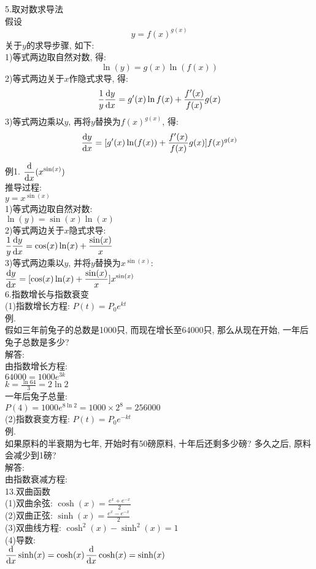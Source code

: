 5.取对数求导法\\
假设
\[y=f(x)^{g(x)}\]
关于$y$的求导步骤, 如下:\\
1)等式两边取自然对数, 得:
\[\ln(y)=g(x)\ln(f(x))\]
2)等式两边关于$x$作隐式求导, 得:
\[\frac{1}{y}\frac{\mathop{}\!\mathrm{d} y}{\mathop{}\!\mathrm{d} x}=g'(x)\ln f(x)+\frac{f'(x)}{f(x)}g(x)\]
3)等式两边乘以$y$, 再将$y$替换为$f(x)^{g(x)}$, 得:
\[\frac{\mathop{}\!\mathrm{d} y}{\mathop{}\!\mathrm{d} x}=[g'(x)\ln(f(x))+\frac{f'(x)}{f(x)}g(x)]f(x)^{g(x)}\]

例1.
\phantom{例}$\displaystyle\frac{\mathop{}\!\mathrm{d}}{\mathop{}\!\mathrm{d} x}(x^{\sin(x)})$\\
推导过程:\\
$\displaystyle y=x^{\sin(x)}$\\
1)等式两边取自然对数:\\
\phantom{\qquad}$\displaystyle\ln(y)=\sin(x)\ln(x)$\\
2)等式两边关于$x$隐式求导:\\
\phantom{\qquad}$\displaystyle\frac{1}{y}\frac{\mathop{}\!\mathrm{d} y}{\mathop{}\!\mathrm{d} x}=\cos(x)\ln(x)+\frac{\sin(x)}{x}$\\
3)等式两边乘以$y$, 并将$y$替换为$x^{\sin(x)}$:\\
\phantom{\qquad}$\displaystyle\frac{\mathop{}\!\mathrm{d} y}{\mathop{}\!\mathrm{d} x}=[\cos(x)\ln(x)+\frac{\sin(x)}{x}]x^{\sin(x)}$\\[2ex]

6.指数增长与指数衰变\\
(1)指数增长方程: $\displaystyle P(t)=P_0e^{kt}$\\
例.\\
\phantom{空格}假如三年前兔子的总数是1000只, 而现在增长至64000只, 那么从现在开始, 一年后兔子总数是多少?\\
解答:\\
由指数增长方程:\\
\phantom{qquad}$\displaystyle 64000=1000e^{3k}$\\
$\displaystyle k=\frac{\ln64}{3}=2\ln2$\\
一年后兔子总量:\\
$\displaystyle P(4)=1000e^{8\ln2}=1000\times2^8=256000$\\[1ex]

(2)指数衰变方程: $P(t)=P_0e^{-kt}$\\
例.\\
\phantom{空格}如果原料的半衰期为七年, 开始时有50磅原料, 十年后还剩多少磅? 多久之后, 原料会减少到1磅?\\
解答:\\
由指数衰减方程:\\


13.双曲函数\\[1ex]
(1)双曲余弦: $\displaystyle\cosh(x)=\frac{e^x+e^{-x}}{2}$\\[1ex]
(2)双曲正弦: $\displaystyle\sinh(x)=\frac{e^x-e^{-x}}{2}$\\[1ex]
(3)双曲线方程: $\cosh^2(x)-\sinh^2(x)=1$\\[1ex]
(4)导数:\\[1ex]
$\displaystyle\frac{\mathop{}\!\mathrm{d} }{\mathop{}\!\mathrm{d} x}\sinh(x)=\cosh(x)$\qquad$\displaystyle\frac{\mathop{}\!\mathrm{d} }{\mathop{}\!\mathrm{d} x}\cosh(x)=\sinh(x)$\\[1ex]
